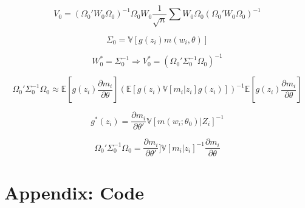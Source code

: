 \documentclass{article}
\newcommand{\E}{\mathbb{E}}
\newcommand{\V}{\mathbb{V}}
\begin{document}
\[ V_0 = (\Omega_0' W_0 \Omega_0)^{-1} \Omega_0 W_0 \frac{1}{\sqrt{n}} \sum W_0 \Omega_0 (\Omega_0' W_0 \Omega_0)^{-1} \]


\[ \Sigma_0 = \V[g(z_i) m(w_i, \theta)] \]

\[ W_0^* = \Sigma_0^{-1} \Rightarrow V_0^* = (\Omega_0' \Sigma_0 ^{-1} \Omega_0)^{-1} \]


\[ \Omega_0' \Sigma_0 ^{-1} \Omega_0 \approx \E[ g(z_i) \frac{\partial m_i}{\partial \theta}] \left( \E[ g(z_i) \V[m_i|z_i] g(z_i) ] \right)^{-1} \E[ g(z_i) \frac{\partial m_i}{\partial \theta}] \]

\[ g^*(z_i) =  \frac{\partial m_i}{\partial \theta'} \V[m(w_i; \theta_0)|Z_i]^{-1} \]

\[ \Omega_0' \Sigma_0 ^{-1} \Omega_0 = \frac{\partial m_i}{\partial \theta'}] \V[m_i|z_i]^{-1} \frac{\partial m_i}{\partial \theta} \]




\section*{Appendix: Code}


%
\end{document}
